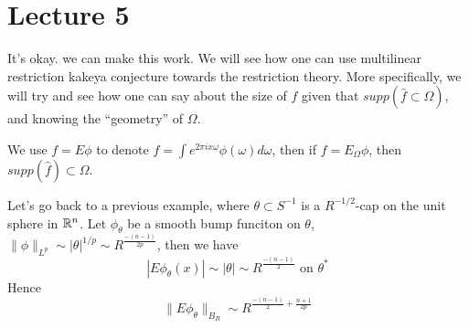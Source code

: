 \section*{Lecture 5}

It's okay. we can make this work.
We will see how one can use multilinear restriction kakeya conjecture towards the restriction theory. More specifically, we will try and see how one can say about the size of $f$ given that $supp(\widehat{f}\subset\Omega)$, and knowing the ``geometry'' of $\Omega$.

We use $f=E\phi$ to denote $f=\int e^{2\pi ix\omega}\phi(\omega)d\omega$, then if $f=E_\Omega\phi$, then $supp(\widehat{f})\subset\Omega$.

Let's go back to a previous example, where $\theta\subset S^{-1}$ is a $R^{-1/2}$-cap on the unit sphere in $\mathbb{R}^n$. Let $\phi_\theta$ be a smooth bump funciton on $\theta$, $\|\phi\|_{L^p}\sim|\theta|^{1/p}\sim R^{\frac{-(n-1)}{2p}}$, then we have
\begin{equation*}
    |E\phi_\theta(x)|\sim|\theta|\sim R^{\frac{-(n-1)}{2}} \text{ on } \theta^*
\end{equation*}
Hence
\begin{equation*}
    \|E\phi_\theta\|_{B_R}\sim R^{\frac{-(n-1)}{2}+\frac{n+1}{2p}}
\end{equation*}

